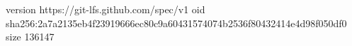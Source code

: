 version https://git-lfs.github.com/spec/v1
oid sha256:2a7a2135eb4f23919666ec80c9a60431574074b2536f80432414e4d98f050df0
size 136147
